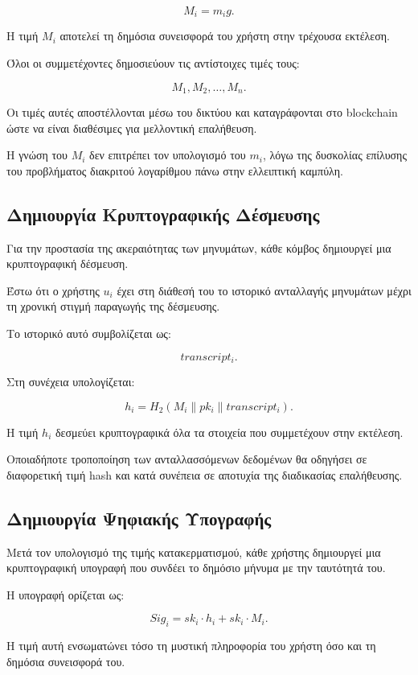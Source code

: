 \documentclass[12pt,a4paper]{report}
\begin{document}
\[
M_i = m_i g.
\]

Η τιμή $M_i$ αποτελεί τη δημόσια συνεισφορά του χρήστη στην τρέχουσα εκτέλεση.

Όλοι οι συμμετέχοντες δημοσιεύουν τις αντίστοιχες τιμές τους:

\[
M_1,M_2,\ldots,M_n.
\]

Οι τιμές αυτές αποστέλλονται μέσω του δικτύου και καταγράφονται στο blockchain ώστε να είναι διαθέσιμες για μελλοντική επαλήθευση.

Η γνώση του $M_i$ δεν επιτρέπει τον υπολογισμό του $m_i$, λόγω της δυσκολίας επίλυσης του προβλήματος διακριτού λογαρίθμου πάνω στην ελλειπτική καμπύλη.

\subsection{Δημιουργία Κρυπτογραφικής Δέσμευσης}

Για την προστασία της ακεραιότητας των μηνυμάτων, κάθε κόμβος δημιουργεί μια κρυπτογραφική δέσμευση.

Έστω ότι ο χρήστης $u_i$ έχει στη διάθεσή του το ιστορικό ανταλλαγής μηνυμάτων μέχρι τη χρονική στιγμή παραγωγής της δέσμευσης.

Το ιστορικό αυτό συμβολίζεται ως:

\[
transcript_i.
\]

Στη συνέχεια υπολογίζεται:

\[
h_i =
H_2
\left(
M_i
\parallel
pk_i
\parallel
transcript_i
\right).
\]

Η τιμή $h_i$ δεσμεύει κρυπτογραφικά όλα τα στοιχεία που συμμετέχουν στην εκτέλεση.

Οποιαδήποτε τροποποίηση των ανταλλασσόμενων δεδομένων θα οδηγήσει σε διαφορετική τιμή hash και κατά συνέπεια σε αποτυχία της διαδικασίας επαλήθευσης.

\subsection{Δημιουργία Ψηφιακής Υπογραφής}

Μετά τον υπολογισμό της τιμής κατακερματισμού, κάθε χρήστης δημιουργεί μια κρυπτογραφική υπογραφή που συνδέει το δημόσιο μήνυμα με την ταυτότητά του.

Η υπογραφή ορίζεται ως:

\[
Sig_i =
sk_i \cdot h_i
+
sk_i \cdot M_i.
\]

Η τιμή αυτή ενσωματώνει τόσο τη μυστική πληροφορία του χρήστη όσο και τη δημόσια συνεισφορά του.
\end{document}

